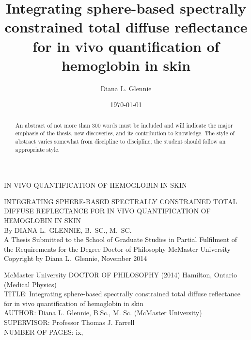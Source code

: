 \documentclass[letterpaper,12pt,twoside,openright]{report} %
\title{Integrating sphere-based spectrally constrained total diffuse reflectance for in vivo quantification of hemoglobin in skin}
\author{Diana L. Glennie}
\date{\today}
\begin{document}
\begin{titlepage} %
    \thispagestyle{empty}
    \vspace*{\fill}
    \begin{center}{\Large
    \uppercase{In vivo quantification of hemoglobin in skin}}
    \end{center}
    \vspace*{\fill}
    \setcounter{page}{0} %
\end{titlepage}

\begin{titlepage} %
\thispagestyle{empty}
\centering
\vspace*{\fill} %
{\Large \uppercase{Integrating sphere-based spectrally constrained total diffuse reflectance for in vivo quantification of hemoglobin in skin}\\
\vfill
By DIANA L.\ GLENNIE, B.\ SC., M.\ SC.\\}
\vfill
A Thesis Submitted to the School of Graduate Studies in Partial Fulfilment of
the Requirements for the Degree Doctor of Philosophy
\vfill%
McMaster University \textcopyright{} Copyright by Diana L.\ Glennie, November 2014
\end{titlepage}
{\noindent McMaster University DOCTOR OF PHILOSOPHY (2014) Hamilton, Ontario (Medical Physics)\\
TITLE: Integrating sphere-based spectrally constrained total diffuse reflectance for in vivo quantification of hemoglobin in skin\\
AUTHOR: Diana L. Glennie, B.Sc., M. Sc. (McMaster University)\\
SUPERVISOR: Professor Thomas J. Farrell\\
NUMBER OF PAGES: ix,~\pageref{LastPage}}
    \begin{abstract}
        \thispagestyle{plain}
        \setcounter{page}{3}
            An abstract of not more than 300 words must be included and will indicate the major emphasis of the thesis, new discoveries, and its contribution to knowledge. The style of abstract varies somewhat from discipline to discipline; the student should follow an appropriate style.
    \end{abstract}
\end{document}
